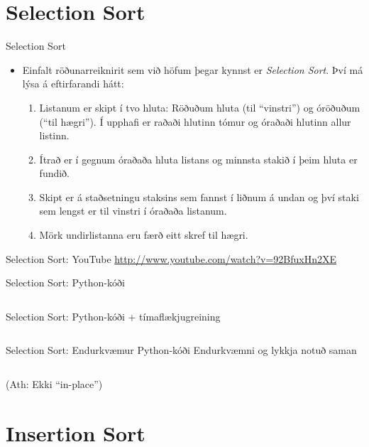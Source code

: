 \documentclass[handout]{beamer}
\begin{document}
\section{Selection Sort}

\begin{frame}{Selection Sort}
\begin{itemize}
 \item Einfalt röðunarreiknirit sem við höfum þegar kynnst er \emph{Selection Sort}. Því má lýsa á eftirfarandi hátt:
 \begin{enumerate}
  \item Listanum er skipt í tvo hluta: Röðuðum hluta (til ``vinstri'') og óröðuðum (``til hægri''). Í upphafi er raðaði hlutinn tómur og óraðaði hlutinn allur listinn.
  \item Ítrað er í gegnum óraðaða hluta listans og minnsta stakið í þeim hluta er fundið.
  \item Skipt er á staðsetningu staksins sem fannst í liðnum á undan og því staki sem lengst er til vinstri í óraðaða listanum.
  \item Mörk undirlistanna eru færð eitt skref til hægri.
 \end{enumerate}
\end{itemize}
\end{frame}

\begin{frame}{Selection Sort: YouTube}
\url{http://www.youtube.com/watch?v=92BfuxHn2XE}
\end{frame}

\begin{frame}[fragile]{Selection Sort: Python-kóði}
\inputminted[linenos]{python}{Code/Python/selection_sort.py}
\end{frame}

\begin{frame}[fragile]{Selection Sort: Python-kóði + tímaflækjugreining}
\inputminted[linenos]{python}{Code/Python/selection_sort_complexity.py}
\end{frame}

\begin{frame}[fragile]{Selection Sort: Endurkvæmur Python-kóði}
Endurkvæmni og lykkja notuð saman
\inputminted[linenos]{python}{Code/Python/selection_sort_recursive.py}
(Ath: Ekki ``in-place'')
\end{frame}

\section{Insertion Sort}
\end{document}
